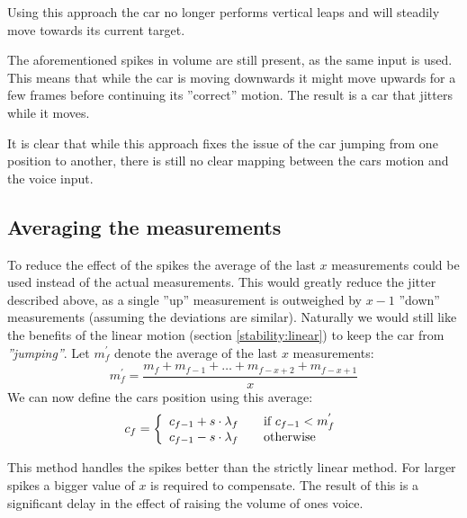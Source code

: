 Using this approach the car no longer performs vertical leaps and will steadily move towards its current target.

The aforementioned spikes in volume are still present, as the same input is used.
This means that while the car is moving downwards it might move upwards for a few frames before continuing its ''correct'' motion.
The result is a car that jitters while it moves.

It is clear that while this approach fixes the issue of the car jumping from one position to another, there is still no clear mapping between the cars motion and the voice input.

\subsection{Averaging the measurements}\label{stability:average}
To reduce the effect of the spikes the average of the last $x$ measurements could be used instead of the actual measurements.
This would greatly reduce the jitter described above, as a single ''up'' measurement is outweighed by $x-1$ ''down'' measurements (assuming the deviations are similar).
Naturally we would still like the benefits of the linear motion (section \ref{stability:linear}) to keep the car from \textit{''jumping''}.
Let $m^{'}_{f}$ denote the average of the last $x$ measurements:
$$m^{'}_{f} = \frac{m_f + m_{f-1} + \dots + m_{f-x+2} + m_{f-x+1}}{x}$$
We can now define the cars position using this average:
$$c_f = \left\{ 
  \begin{array}{l l}
    c_{f-1} + s \cdot \lambda_f & \quad \text{if $c_{f-1} < m^{'}_{f}$}\\
    c_{f-1} - s \cdot \lambda_f & \quad \text{otherwise}
  \end{array} \right.$$

This method handles the spikes better than the strictly linear method.
For larger spikes a bigger value of $x$ is required to compensate.
The result of this is a significant delay in the effect of raising the volume of ones voice.

